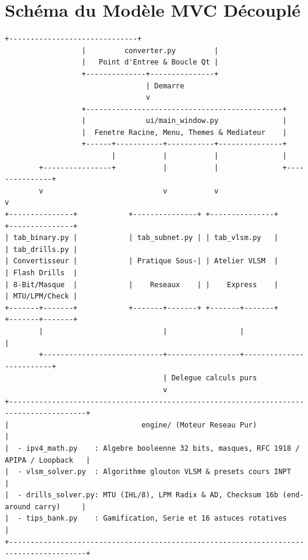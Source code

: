 \documentclass[11pt,a4paper]{report}
\begin{document}
\section{Sch\'ema du Mod\`ele MVC D\'ecoupl\'e}
\begin{center}
\begin{lstlisting}[basicstyle=\ttfamily\scriptsize]
                  +------------------------------+
                  |         converter.py         |
                  |   Point d'Entree & Boucle Qt |
                  +--------------+---------------+
                                 | Demarre
                                 v
                  +----------------------------------------------+
                  |              ui/main_window.py               |
                  |  Fenetre Racine, Menu, Themes & Mediateur    |
                  +------+-----------+-----------+---------------+
                         |           |           |               |
        +----------------+           |           |               +---------------+
        v                            v           v                               v
+---------------+            +---------------+ +---------------+         +---------------+
| tab_binary.py |            | tab_subnet.py | | tab_vlsm.py   |         | tab_drills.py |
| Convertisseur |            | Pratique Sous-| | Atelier VLSM  |         | Flash Drills  |
| 8-Bit/Masque  |            |    Reseaux    | |    Express    |         | MTU/LPM/Check |
+-------+-------+            +-------+-------+ +-------+-------+         +-------+-------+
        |                            |                 |                         |
        +----------------------------+-----------------+-------------------------+
                                     | Delegue calculs purs
                                     v
+----------------------------------------------------------------------------------------+
|                               engine/ (Moteur Reseau Pur)                              |
|  - ipv4_math.py    : Algebre booleenne 32 bits, masques, RFC 1918 / APIPA / Loopback   |
|  - vlsm_solver.py  : Algorithme glouton VLSM & presets cours INPT                      |
|  - drills_solver.py: MTU (IHL/8), LPM Radix & AD, Checksum 16b (end-around carry)     |
|  - tips_bank.py    : Gamification, Serie et 16 astuces rotatives                       |
+----------------------------------------------------------------------------------------+
\end{lstlisting}
\end{center}
\end{document}
